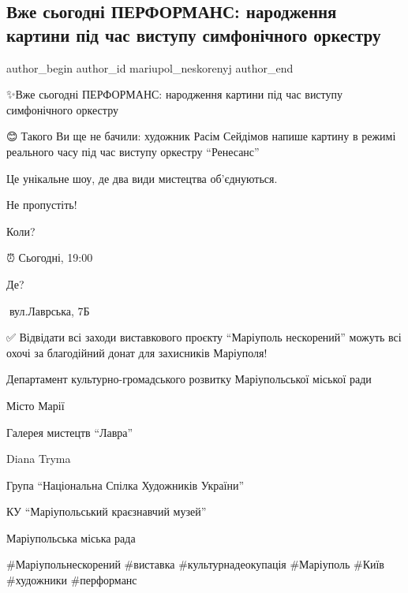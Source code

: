  
 
 
 
 

\subsection{Вже сьогодні ПЕРФОРМАНС: народження картини під час виступу симфонічного оркестру}
\label{sec:29_08_2023.fb.mariupol_neskorenyj.1.performans_narodzhennja_kartyny}

\ifcmt
 author_begin
   author_id mariupol_neskorenyj
 author_end
\fi

✨️Вже сьогодні ПЕРФОРМАНС: народження картини під час виступу симфонічного оркестру\par
😊🎨Такого Ви ще не бачили: художник Расім Сейдімов напише картину в режимі реального часу під час виступу оркестру \enquote{Ренесанс} \par
Це унікальне шоу, де два види мистецтва об'єднуються. \par
Не пропустіть!\par
Коли? \par
⏰ Сьогодні, 19:00\par
Де?\par
📍вул.Лаврська, 7Б\par
✅ Відвідати всі заходи виставкового проєкту \enquote{Маріуполь нескорений} можуть всі охочі за благодійний донат для захисників Маріуполя!\par
Департамент культурно-громадського розвитку Маріупольської міської ради \par
Місто Марії \par
Галерея мистецтв \enquote{Лавра} \par
Diana Tryma \par
Група \enquote{Національна Спілка Художників України} \par
КУ \enquote{Маріупольський краєзнавчий музей} \par
Маріупольська міська рада \par
\#Маріупольнескорений \#виставка \#культурнадеокупація \#Маріуполь \#Київ \#художники \#перформанс\par
